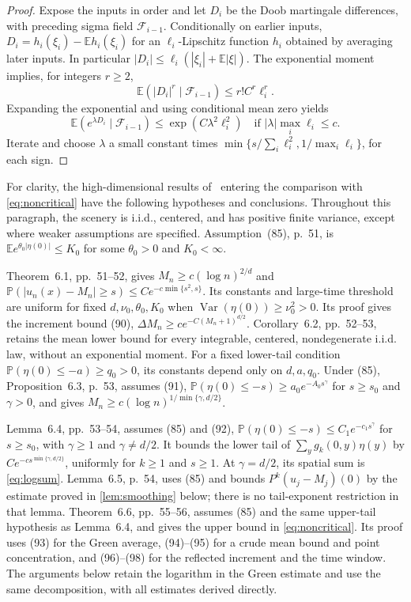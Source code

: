 \documentclass[11pt]{amsart}
\theoremstyle{remark}
\newcommand{\Pp}{\mathbb P}
\newcommand{\E}{\mathbb E}
\DeclareMathOperator{\Var}{Var}
\begin{document}
\begin{proof}
Expose the inputs in order and let $D_i$ be the Doob martingale
differences, with preceding sigma field $\mathcal F_{i-1}$.
Conditionally on earlier inputs, $D_i=h_i(\xi_i)-\E h_i(\xi_i)$ for an
$\ell_i$-Lipschitz function $h_i$ obtained by averaging later inputs.
In particular
$|D_i|\le\ell_i(|\xi_i|+\E|\xi|)$.
The exponential moment implies, for integers $r\ge2$,
\[
 \E(|D_i|^r\mid\mathcal F_{i-1})\le r!C^r\ell_i^r.
\]
Expanding the exponential and using conditional mean zero yields
\[
 \E(e^{\lambda D_i}\mid\mathcal F_{i-1})
 \le \exp(C\lambda^2\ell_i^2)
 \quad\text{if }|\lambda|\max_i\ell_i\le c.
\]
Iterate and choose $\lambda$ a small constant times
$\min\{s/\sum_i\ell_i^2,1/\max_i\ell_i\}$, for each sign.
\end{proof}

For clarity, the high-dimensional results of~\cite{BP} entering the
comparison with \eqref{eq:noncritical} have the following hypotheses and
conclusions. Throughout this paragraph, the scenery is i.i.d., centered,
and has positive finite variance, except where weaker assumptions are
specified. Assumption~(85), p.~51, is
$\E e^{\theta_0|\eta(0)|}\le K_0$ for some $\theta_0>0$ and $K_0<\infty$.

Theorem~6.1, pp.~51--52, gives
$M_n\ge c(\log n)^{2/d}$ and
$\Pp(|u_n(x)-M_n|\ge s)\le C e^{-c\min\{s^2,s\}}$.
Its constants and large-time threshold are uniform for fixed
$d,\nu_0,\theta_0,K_0$ when $\Var(\eta(0))\ge\nu_0^2>0$.
Its proof gives the increment bound (90),
$\Delta M_n\ge c e^{-C(M_n+1)^{d/2}}$.
Corollary~6.2, pp.~52--53, retains the mean lower bound for every
integrable, centered, nondegenerate i.i.d. law, without an exponential
moment. For a fixed lower-tail condition
$\Pp(\eta(0)\le-a)\ge q_0>0$, its constants depend only on $d,a,q_0$.
Under (85), Proposition~6.3, p.~53, assumes (91),
$\Pp(\eta(0)\le-s)\ge a_0e^{-A_0s^\gamma}$ for $s\ge s_0$ and
$\gamma>0$, and gives
$M_n\ge c(\log n)^{1/\min\{\gamma,d/2\}}$.

Lemma~6.4, pp.~53--54, assumes (85) and (92),
$\Pp(\eta(0)\le-s)\le C_1e^{-c_1s^\gamma}$ for $s\ge s_0$, with
$\gamma\ge1$ and $\gamma\ne d/2$. It bounds the lower tail of
$\sum_y g_k(0,y)\eta(y)$ by
$Ce^{-cs^{\min\{\gamma,d/2\}}}$, uniformly for $k\ge1$ and $s\ge1$.
At $\gamma=d/2$, its spatial sum is \eqref{eq:logsum}.
Lemma~6.5, p.~54, uses (85) and bounds
$P^k(u_j-M_j)(0)$ by the estimate proved in \cref{lem:smoothing} below;
there is no tail-exponent restriction in that lemma.
Theorem~6.6, pp.~55--56, assumes (85) and the same upper-tail hypothesis
as Lemma~6.4, and gives the upper bound in \eqref{eq:noncritical}.
Its proof uses (93) for the Green average, (94)--(95) for a crude mean
bound and point concentration, and (96)--(98) for the reflected increment
and the time window. The arguments below retain the logarithm in the
Green estimate and use the same decomposition, with all estimates
derived directly.
\end{document}
